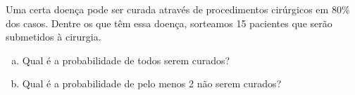 %
%


\begin{exercicioBanco}[\valorquestao]
Uma certa doença pode ser curada através de procedimentos cirúrgicos em 80\% dos casos. Dentre os que têm essa doença, sorteamos 15 pacientes que serão submetidos à cirurgia.
%
\begin{enumerate}[(a)]
    \item Qual é a probabilidade de todos serem curados?
    \item Qual é a probabilidade de pelo menos 2 não serem curados?
\end{enumerate}
%
\end{exercicioBanco}


